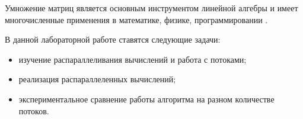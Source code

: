\Introduction

Умножение матриц является основным инструментом линейной алгебры и имеет многочисленные применения в математике, физике, программировании \cite{haskell}.

В данной лабораторной работе ставятся следующие задачи:

\begin{itemize}
    \item изучение распараллеливания вычислений и работа с потоками;
    \item реализация распараллеленных вычислений;
    \item экспериментальное сравнение работы алгоритма на разном количестве потоков.
\end{itemize}

